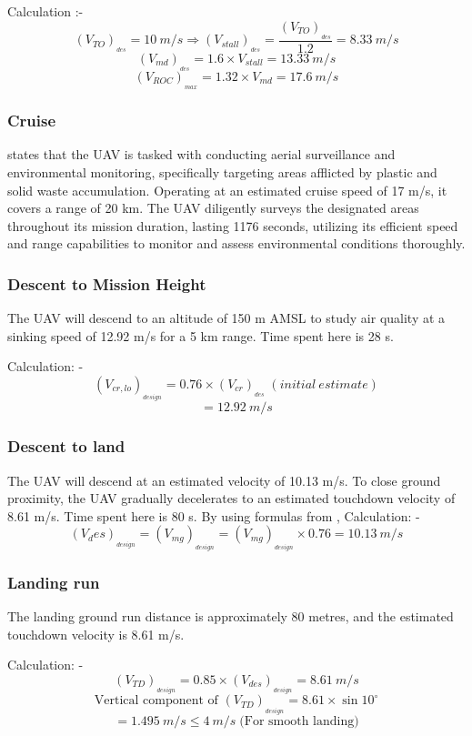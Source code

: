 \documentclass[12 pt]{article}
\begin{document}
Calculation :- 
$$ (V_{TO})_{_{des}} = 10 \: m/s \Rightarrow (V_{stall})_{_{des}} = \frac{(V_{TO})_{_{des}}}{1.2} = 8.33 \: m/s $$
$$ (V_{md})_{_{des}} = 1.6 \times V_{stall} = 13.33 \: m/s $$
$$ (V_{ROC})_{_{max}} = 1.32 \times V_{md} = 17.6 \: m/s $$

\subsubsection{{Cruise}}
\cite{alhajjaji2017design} states that the UAV is tasked with conducting aerial surveillance and environmental monitoring, specifically targeting areas afflicted by plastic and solid waste accumulation. Operating at an estimated cruise speed of 17 m/s, it covers a range of 20 km. The UAV diligently surveys the designated areas throughout its mission duration, lasting 1176 seconds, utilizing its efficient speed and range capabilities to monitor and assess environmental conditions thoroughly.

\subsubsection{{Descent to Mission Height}}
The UAV will descend to an altitude of 150 m AMSL to study air quality at a sinking speed of 12.92 m/s for a 5 km range. Time spent here is 28 s.

Calculation: - 
$$(V_{cr,lo})_{_{design}} = 0.76 \times (V_{cr})_{_{des}} \;  (initial \: estimate) $$
$$ = 12.92 \: m/s $$

\subsubsection{{Descent to land}}
The UAV will descend at an estimated velocity of 10.13 m/s. To close ground proximity, the UAV gradually decelerates to an estimated touchdown velocity of 8.61 m/s. Time spent here is 80 s. By using formulas from \cite{Anderson1},
Calculation: - 
$$(V_des)_{_{design}} = (V_{mg})_{_{design}} = (V_{mg})_{_{design}} \times 0.76 = 10.13 \: m/s $$

\subsubsection{{Landing run}}
The landing ground run distance is approximately 80 metres, and the estimated touchdown velocity is 8.61 m/s.

Calculation: - 
$$ (V_{TD})_{_{design}} = 0.85 \times (V_{des})_{_{design}} = 8.61 \: m/s  $$
$$ \text{Vertical component of } (V_{TD})_{_{design}} = 8.61 \times \sin{10^{\circ}} $$
$$ = 1.495 \: m/s \leq 4 \: m/s \; \text{(For smooth landing)} $$
\end{document}

